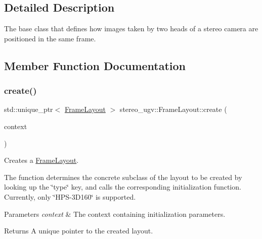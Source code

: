 \subsection{Detailed Description}
The base class that defines how images taken by two heads of a stereo camera are positioned in the same frame. 

\subsection{Member Function Documentation}
\mbox{\label{classstereo__ugv_1_1FrameLayout_adaaac30572f6e3b6fc88da66873c2e77}} 
\subsubsection{\texorpdfstring{create()}{create()}}
{\footnotesize\ttfamily std\+::unique\+\_\+ptr$<$ \hyperlink{classstereo__ugv_1_1FrameLayout}{Frame\+Layout} $>$ stereo\+\_\+ugv\+::\+Frame\+Layout\+::create (\begin{DoxyParamCaption}\item[{const \hyperlink{classstereo__ugv_1_1Context}{Context} \&}]{context }\end{DoxyParamCaption})\hspace{0.3cm}{\ttfamily [static]}}



Creates a \hyperlink{classstereo__ugv_1_1FrameLayout}{Frame\+Layout}. 

The function determines the concrete subclass of the layout to be created by looking up the \char`\"{}type\char`\"{} key, and calls the corresponding initialization function. Currently, only \char`\"{}\+H\+P\+S-\/3\+D160\char`\"{} is supported. 
\begin{DoxyParams}{Parameters}
{\em context} & The context containing initialization parameters. \\
\hline
\end{DoxyParams}
\begin{DoxyReturn}{Returns}
A unique pointer to the created layout. 
\end{DoxyReturn}
\mbox{\label{classstereo__ugv_1_1FrameLayout_af5ab49a35cfbb59a79863720e7985d29}} 
